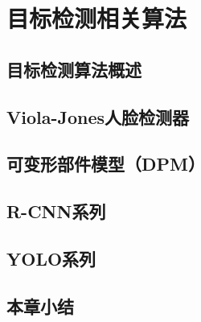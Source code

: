 \section{目标检测相关算法}
\setcounter{figure}{0}

\subsection{目标检测算法概述}

\subsection{Viola-Jones人脸检测器}

\subsection{可变形部件模型（DPM）}

\subsection{R-CNN系列}

\subsection{YOLO系列}

\subsection{本章小结}









